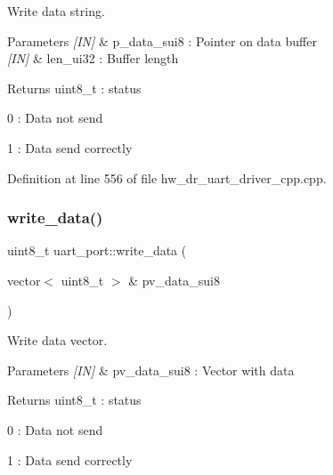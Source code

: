 Write data string. 


\begin{DoxyParams}{Parameters}
{\em \mbox{[}\+I\+N\mbox{]}} & p\+\_\+data\+\_\+sui8 \+: Pointer on data buffer \\
\hline
{\em \mbox{[}\+I\+N\mbox{]}} & len\+\_\+ui32 \+: Buffer length \\
\hline
\end{DoxyParams}
\begin{DoxyReturn}{Returns}
uint8\+\_\+t \+: status \begin{DoxyItemize}
\item 0 \+: Data not send \item 1 \+: Data send correctly \end{DoxyItemize}

\end{DoxyReturn}


Definition at line 556 of file hw\+\_\+dr\+\_\+uart\+\_\+driver\+\_\+cpp.\+cpp.

\mbox{\label{group___u_a_r_t_gaf759799fa5def8374743f2337964aee2}} 
\subsubsection{write\_data()\hspace{0.1cm}{\footnotesize\ttfamily [3/3]}}
{\footnotesize\ttfamily uint8\+\_\+t uart\+\_\+port\+::write\+\_\+data (\begin{DoxyParamCaption}\item[{vector$<$ uint8\+\_\+t $>$ \&}]{pv\+\_\+data\+\_\+sui8 }\end{DoxyParamCaption})}



Write data vector. 


\begin{DoxyParams}{Parameters}
{\em \mbox{[}\+I\+N\mbox{]}} & pv\+\_\+data\+\_\+sui8 \+: Vector with data \\
\hline
\end{DoxyParams}
\begin{DoxyReturn}{Returns}
uint8\+\_\+t \+: status \begin{DoxyItemize}
\item 0 \+: Data not send \item 1 \+: Data send correctly \end{DoxyItemize}

\end{DoxyReturn}


